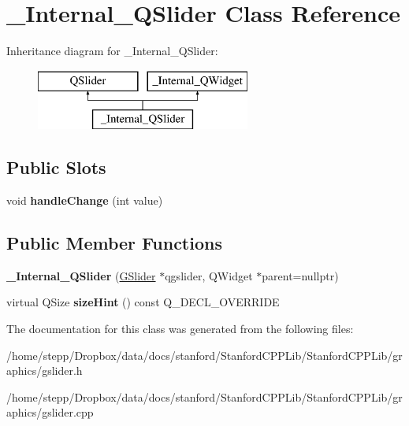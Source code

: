 \hypertarget{class__Internal__QSlider}{}\section{\+\_\+\+Internal\+\_\+\+Q\+Slider Class Reference}
\label{class__Internal__QSlider}
Inheritance diagram for \+\_\+\+Internal\+\_\+\+Q\+Slider\+:\begin{figure}[H]
\begin{center}
\leavevmode
\includegraphics[height=2.000000cm]{class__Internal__QSlider}
\end{center}
\end{figure}
\subsection*{Public Slots}
\begin{DoxyCompactItemize}
\item 
\mbox{\label{class__Internal__QSlider_a6877980cb6432c0819ecc7815a228d22}} 
void {\bfseries handle\+Change} (int value)
\end{DoxyCompactItemize}
\subsection*{Public Member Functions}
\begin{DoxyCompactItemize}
\item 
\mbox{\label{class__Internal__QSlider_a7532c76f0de8b540ef649e26d26341ce}} 
{\bfseries \+\_\+\+Internal\+\_\+\+Q\+Slider} (\mbox{\hyperlink{classGSlider}{G\+Slider}} $\ast$qgslider, Q\+Widget $\ast$parent=nullptr)
\item 
\mbox{\label{class__Internal__QSlider_a9d4379d562552cc594a580beeafdd570}} 
virtual Q\+Size {\bfseries size\+Hint} () const Q\+\_\+\+D\+E\+C\+L\+\_\+\+O\+V\+E\+R\+R\+I\+DE
\end{DoxyCompactItemize}


The documentation for this class was generated from the following files\+:\begin{DoxyCompactItemize}
\item 
/home/stepp/\+Dropbox/data/docs/stanford/\+Stanford\+C\+P\+P\+Lib/\+Stanford\+C\+P\+P\+Lib/graphics/gslider.\+h\item 
/home/stepp/\+Dropbox/data/docs/stanford/\+Stanford\+C\+P\+P\+Lib/\+Stanford\+C\+P\+P\+Lib/graphics/gslider.\+cpp\end{DoxyCompactItemize}
